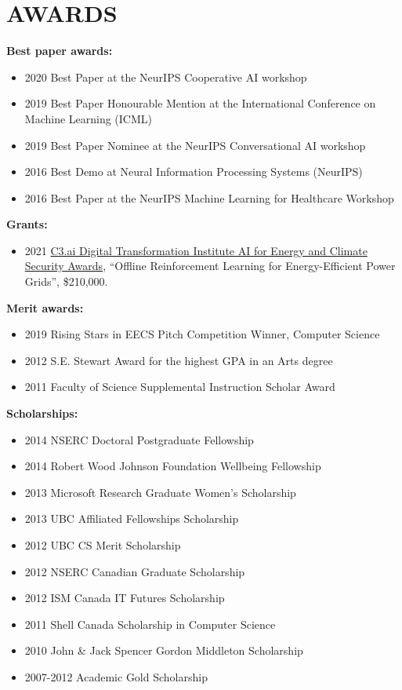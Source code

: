 \documentclass[paper=letter,fontsize=11pt]{scrartcl} %
\newcommand{\NewPart}[2]{\section*{\uppercase{#1} #2}}
\begin{document}
\NewPart{Awards}{}
\textbf{Best paper awards:}
\begin{itemize}
\item 2020 Best Paper at the NeurIPS Cooperative AI workshop
\item 2019 Best Paper Honourable Mention at the International Conference on Machine Learning (ICML)
\item 2019 Best Paper Nominee at the NeurIPS Conversational AI workshop
\item 2016 Best Demo at Neural Information Processing Systems (NeurIPS)
\item 2016 Best Paper at the NeurIPS Machine Learning for Healthcare Workshop
\end{itemize}

\noindent \textbf{Grants:}
\begin{itemize}
\item 2021 \href{https://c3dti.ai/c3-announces-energy-climate-awards/}{C3.ai Digital Transformation Institute AI for Energy and Climate Security Awards}, “Offline Reinforcement Learning for Energy-Efficient Power Grids”, \$210,000. %
\end{itemize}

\noindent \textbf{Merit awards:}
\begin{itemize}
\item 2019 Rising Stars in EECS Pitch Competition Winner, Computer Science
\item 2012 S.E. Stewart Award for the highest GPA in an Arts degree
\item 2011 Faculty of Science Supplemental Instruction Scholar Award
\end{itemize}

\noindent \textbf{Scholarships:}
\begin{itemize}
\item 2014 NSERC Doctoral Postgraduate Fellowship
\item 2014 Robert Wood Johnson Foundation Wellbeing Fellowship
\item 2013 Microsoft Research Graduate Women's Scholarship
\item 2013 UBC Affiliated Fellowships Scholarship
\item 2012 UBC CS Merit Scholarship
\item 2012 NSERC Canadian Graduate Scholarship
\item 2012 ISM Canada IT Futures Scholarship
\item 2011 Shell Canada Scholarship in Computer Science
\item 2010 John \& Jack Spencer Gordon Middleton Scholarship
\item 2007-2012 Academic Gold Scholarship
\end{itemize}
\end{document}
